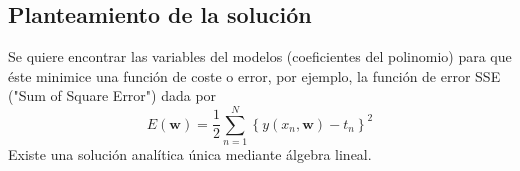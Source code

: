 \subsection{Planteamiento de la solución}
Se quiere encontrar las variables del modelos (coeficientes del polinomio) para que éste minimice una función de coste o error, por ejemplo, la función de error SSE ("Sum of Square Error") dada por \[ E(\mathbf{w})=\dfrac{1}{2}\sum_{n=1}^{N}\left\{y(x_n,\mathbf{w})-t_n\right\}^2 \]Existe una solución analítica única mediante álgebra lineal.
\begin{center}
\end{center}